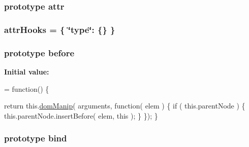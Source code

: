 \hypertarget{jquery-1_810_82-vsdoc_8js_aa76c97588b348e5c1975810431456d90}{
\subsubsection[{attr}]{ {\bf prototype} attr}}\label{jquery-1_810_82-vsdoc_8js_aa76c97588b348e5c1975810431456d90}
\hypertarget{jquery-1_810_82-vsdoc_8js_ad38ac586d2608526e63fb2b63fe11c6d}{
\subsubsection[{attr\-Hooks}]{ attr\-Hooks = \{ \char`\"{}type\char`\"{}\-: \{\} \}}}\label{jquery-1_810_82-vsdoc_8js_ad38ac586d2608526e63fb2b63fe11c6d}
\hypertarget{jquery-1_810_82-vsdoc_8js_a4d41e7b04915cba0cef42dc066c7a18f}{
\subsubsection[{before}]{ {\bf prototype} before}}\label{jquery-1_810_82-vsdoc_8js_a4d41e7b04915cba0cef42dc066c7a18f}
{\bfseries Initial value\-:}
\begin{DoxyCode}
= \textcolor{keyword}{function}() \{


        \textcolor{keywordflow}{return} this.\hyperlink{jquery-1_810_82-vsdoc_8js_a00a63bd312ef048290dc1755ccb8bae4}{domManip}( arguments, \textcolor{keyword}{function}( elem ) \{
            \textcolor{keywordflow}{if} ( this.parentNode ) \{
                this.parentNode.insertBefore( elem, \textcolor{keyword}{this} );
            \}
        \});
    \}
\end{DoxyCode}
\hypertarget{jquery-1_810_82-vsdoc_8js_affdd1c31b7dbeb03060856a4e0e33d5e}{
\subsubsection[{bind}]{ {\bf prototype} bind}}\label{jquery-1_810_82-vsdoc_8js_affdd1c31b7dbeb03060856a4e0e33d5e}
